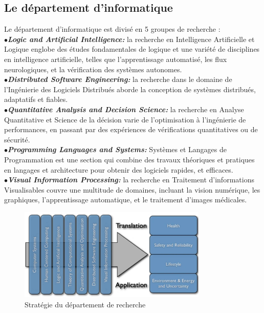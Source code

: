 \documentclass[10pt]{report}
\begin{document}
	\subsection{Le département d'informatique}
	
	Le département d'informatique est divisé en 5 groupes de recherche : 
	\\{$\bullet$}\textit{\textbf{Logic and Artificial Intelligence:}} la recherche en Intelligence Artificielle et Logique englobe des études fondamentales de logique et une variété de disciplines en intelligence artificielle, telles que l'apprentissage automatisé, les flux neurologiques, et la vérification des systèmes autonomes.
	\\{$\bullet$}\textit{\textbf{Distributed Software Engineering:}} la recherche dans le domaine de l'Ingénierie des Logiciels Distribués aborde la conception de systèmes distribués, adaptatifs et fiables.
	\\{$\bullet$}\textit{\textbf{Quantitative Analysis and Decision Science:}} la recherche en Analyse Quantitative et Science de la décision varie de l'optimisation à l'ingénierie de performances, en passant par des expériences de vérifications quantitatives ou de sécurité.
	\\{$\bullet$}\textit{\textbf{Programming Languages and Systems:}} Systèmes et Langages de Programmation est une section qui combine des travaux théoriques et pratiques en langages et architecture pour obtenir des logiciels rapides, et efficaces.
	\\{$\bullet$}\textit{\textbf{Visual Information Processing:}} la recherche en Traitement d'informations Visualisables couvre une multitude de domaines, incluant la vision numérique, les graphiques, l'apprentissage automatique, et le traitement d'images médicales.
	
	\begin{figure}
		\includegraphics[width=9cm]{Reports/figures/research_strategy.jpg}
		\caption{Stratégie du département de recherche}
		\label{Stratégie du département de recherche}
	\end{figure}~\par
	
\end{document}
